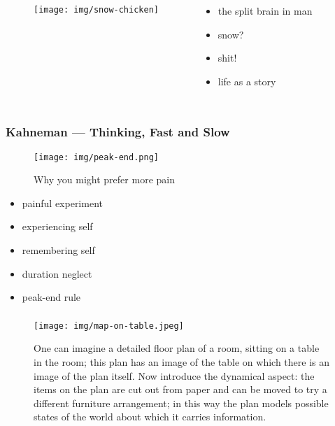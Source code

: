 \documentclass[UTF8,11pt,colorlinks,compress,openany]{beamer}%
\begin{document}
\begin{frame}\frametitle{}
\begin{columns}
	\begin{figure}[H]
		\begin{center}
			\texttt{[image: img/snow-chicken]}
		\end{center}
	\end{figure}
\begin{itemize}
	\item the split brain in man
	\item snow?
	\item shit!
	\item life as a story
\end{itemize}
\end{columns}
\end{frame}

\begin{frame}\frametitle{Kahneman --- Thinking, Fast and Slow}
	\begin{figure}[H]
		\begin{center}
			\texttt{[image: img/peak-end.png]}\caption{Why you might prefer more pain}
		\end{center}
	\end{figure}
\begin{itemize}
	\item painful experiment
	\item experiencing self
	\item remembering self
	\item duration neglect
	\item peak-end rule
\end{itemize}
\end{frame}

\begin{frame}\frametitle{}
\begin{figure}
\texttt{[image: img/map-on-table.jpeg]}\caption{One can imagine a detailed floor plan of a room, sitting on a table in the room; this plan has an image of the table on which there is an image of the plan itself. Now introduce the dynamical aspect: the items on the plan are cut out from paper and can be moved to try a different furniture arrangement; in this way the plan models possible states of the world about which it carries information.}
\end{figure}
\end{frame}
\end{document}
